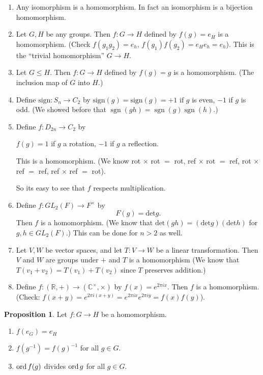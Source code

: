 \documentclass{article}
\theoremstyle{definition} \newtheorem*{definition}{Definition}
\newtheorem{proposition}[theorem]{Proposition}
\DeclareMathOperator{\sgn}{sgn} \DeclareMathOperator{\id}{id}
\begin{document}
\begin{exmps}\hfill \begin{enumerate} \item Any isomorphism is a homomorphism.
        In fact an isomorphism is a bijection homomorphism.  \item Let $G,H$ be
          any groups. Then $f : G \rightarrow H$ defined by $f(g) = e_H$ is a
          homomorphism. (Check $f(g_1 g_2)=e_h$, $f(g_1)f(g_2)=e_He_h = e_h$).
          This is the ``trivial homomorphism'' $G \rightarrow H.$ \item Let $G
          \leq H$. Then $f:G\rightarrow H$ defined by $f(g)=g$ is a
        homomorphism. (The inclusion map of $G$ into $H$.) \item Define
          $\text{sign}:S_n \rightarrow C_2$ by
          $\text{sign}(g)=\text{sign}(g)=+1 \text{ if } g $ is even, $-1$ if
          $g$ is odd. (We showed before that $\sgn(gh)=\sgn(g)\sgn(h)$.) \item
            Define $f:D_{2n} \rightarrow C_2$ by 

    $f(g)=1$ if $g$ a rotation, $-1$ if $g$ a reflection.

    This is a homomorphism. (We know rot $\times$ rot $=$ rot, ref $\times$ rot
    $=$ ref, rot $\times$ ref $=$ ref, ref $\times$ ref $=$ rot).

    So its easy to see that $f$ respects multiplication.

  \item Define $f:GL_2(F) \rightarrow F^\times$ by $$F(g) = \text{det}g.$$ Then
  $f$ is a homomorphism.  (We know that
$\text{det}(gh)=(\text{det}g)(\text{det}h)$ for $g,h \in GL_2(F)$.) This can be
done for $n>2$ as well.  \item Let $V,W$ be vector spaces, and let $T:V
  \rightarrow W$ be a linear transformation. Then $V$ and $W$ are groups under
  $+$ and $T$ is a homomorphism (We know that $T(v_1 + v_2)=T(v_1)+T(v_2)$
  since $T$ preserves addition.) \item Define $f: (\mathbb{R},+)\rightarrow
    (\mathbb{C}^\times,\times)$ by $f(x)=e^{2 \pi i x}.$ Then $f$ is a
    homomorphism. (Check: $f(x+y)=e^{2\pi i (x+y)}=e^{2\pi i x}e^{2 \pi i
    y}=f(x)f(y)$).\\ \end{enumerate}
  
\end{exmps}


\begin{proposition} Let $f: G \rightarrow H$ be a homomorphism.
\begin{enumerate} \item $f(e_G)=e_H$ \item $f(g^{-1})=f(g)^{-1}$ for all $g \in
    G$.  \item $\operatorname{\text{ord}} f(g)$ divides $\operatorname{\text{ord}} g$ for all $g \in G$.  \end{enumerate}
\end{proposition}
\end{document}
